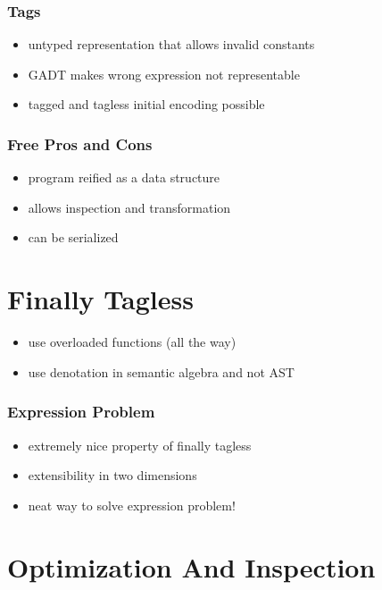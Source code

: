 \documentclass[aspectratio=169]{beamer}
\begin{document}
\begin{frame}
  \frametitle{Tags}
  \begin{itemize}
  \item untyped representation that allows invalid constants
  \item GADT makes wrong expression not representable
  \item tagged and tagless initial encoding possible
  \end{itemize}
\end{frame}

\begin{frame}
  \frametitle{Free \textemdash{} Pros and Cons}
  \begin{itemize}
  \item program reified as a data structure
  \item allows inspection and transformation
  \item can be serialized
  \end{itemize}

  \section{Finally Tagless}\label{sec:finally-tagless}

\begin{frame}
  \begin{itemize}
  \item use overloaded functions (all the way)
  \item use denotation in semantic algebra and not AST
  \end{itemize}
\end{frame}

\begin{frame}
  \frametitle{Expression Problem}
  \begin{itemize}
  \item extremely nice property of finally tagless
  \item extensibility in two dimensions
  \item neat way to solve expression problem!
  \end{itemize}
\end{frame}

\end{frame}

\section{Optimization And Inspection}\label{sec:optimization-and-inspection}
\end{document}
